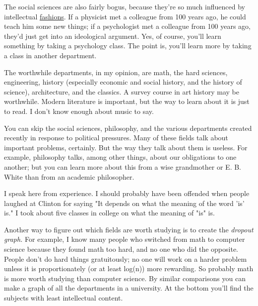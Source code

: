 The social sciences are also fairly bogus,
                    because they're so much influenced by intellectual
                    \href{http://www.paulgraham.com/say.html}{fashions}. If a physicist met a
                    colleague from 100 years ago, he could teach him some new
                    things; if a psychologist met a colleague from 100 years
                    ago, they'd just get into an ideological argument. Yes, of
                    course, you'll learn something by taking a psychology class.
                    The point is, you'll learn more by taking a class in another
                    department.

The worthwhile departments, in my
                    opinion, are math, the hard sciences, engineering, history
                    (especially economic and social history, and the history of
                    science), architecture, and the classics. A survey course in
                    art history may be worthwhile. Modern literature is
                    important, but the way to learn about it is just to read. I
                    don't know enough about music to say.

You can
                    skip the social sciences, philosophy, and the various
                    departments created recently in response to political
                    pressures. Many of these fields talk about important
                    problems, certainly. But the way they talk about them is
                    useless. For example, philosophy talks, among other things,
                    about our obligations to one another; but you can learn more
                    about this from a wise grandmother or E. B. White than from
                    an academic philosopher.

I speak here from
                    experience. I should probably have been offended when people
                    laughed at Clinton for saying "It depends on what the
                    meaning of the word 'is' is." I took about five classes in
                    college on what the meaning of "is" is.

Another
                    way to figure out which fields are worth studying is to
                    create the \emph{ dropout graph.} For example, I know many
                    people who switched from math to computer science because
                    they found math too hard, and no one who did the opposite.
                    People don't do hard things gratuitously; no one will work
                    on a harder problem unless it is proportionately (or at
                    least log(n)) more rewarding. So probably math is more worth
                    studying than computer science. By similar comparisons you
                    can make a graph of all the departments in a university. At
                    the bottom you'll find the subjects with least intellectual
                    content.

